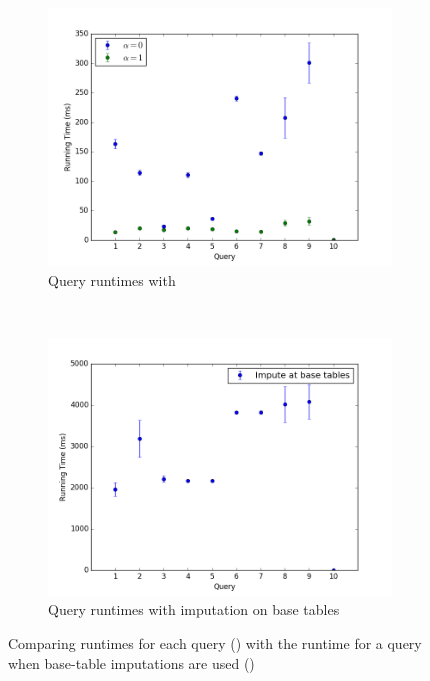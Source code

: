 \begin{figure}
  \begin{subfigure}{\linewidth}
    \includegraphics[width=\columnwidth]{figures/running_times_imputedb.png}
    \caption{Query runtimes with \ProjectName{}}\label{subfig:project-runtime-queries}
  \end{subfigure}
  ~
  \begin{subfigure}{\linewidth}
    \includegraphics[width=\columnwidth]{figures/running_times_base_tables.png}
    \caption{Query runtimes with imputation on base tables}\label{subfig:base-runtime-queries}
  \end{subfigure}
  \par\medskip
  \caption{Comparing \ProjectName{} runtimes for each query
    () with the runtime for a query when base-table
    imputations are used ()}\label{fig:runtimes}
\end{figure}

